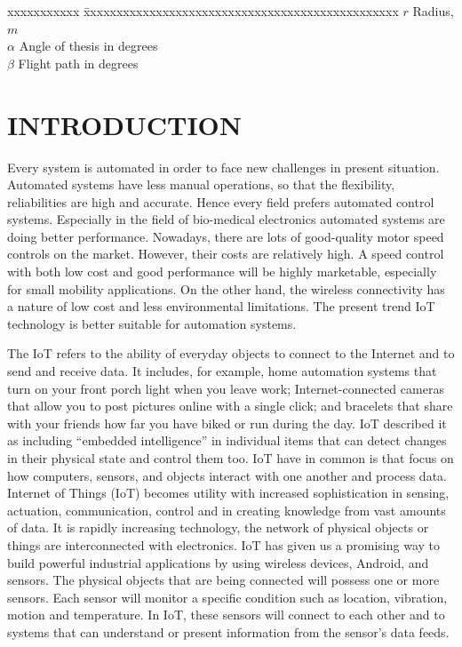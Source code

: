 \documentclass[MTech]{iitmdiss}
\begin{document}
\begin{singlespace}
\begin{tabbing}
xxxxxxxxxxx \= xxxxxxxxxxxxxxxxxxxxxxxxxxxxxxxxxxxxxxxxxxxxxxxx \kill
\textbf{$r$}  \> Radius, $m$ \\
\textbf{$\alpha$}  \> Angle of thesis in degrees \\
\textbf{$\beta$}   \> Flight path in degrees \\
\end{tabbing}
\end{singlespace}

\pagebreak
\clearpage




\chapter{INTRODUCTION}
\label{chap:intro}

Every system is automated in order to face new challenges in present situation. Automated systems have less manual operations, so that the flexibility, reliabilities are high and accurate. Hence every field prefers automated control systems. Especially in the field of bio-medical electronics automated systems are doing better performance. Nowadays, there are lots of good-quality motor speed controls on the market. However, their costs are relatively high. A speed control with both low cost and good performance will be highly marketable, especially for small mobility applications. On the other hand, the wireless connectivity has a nature of low cost and less environmental limitations. The present trend IoT technology is better suitable for automation systems. 

The IoT refers to the ability of everyday objects to connect to the Internet and to send and receive data. It includes, for example, home automation systems that turn on your front porch light when you leave work; Internet-connected cameras that allow you to post pictures online with a single click; and bracelets that share with your friends how far you have biked or run during the day. IoT described it as including “embedded intelligence” in individual items that can detect changes in their physical state and control them too. IoT have in common is that focus on how computers, sensors, and objects interact with one another and process data. Internet of Things (IoT) becomes utility with increased sophistication in sensing, actuation, communication, control and in creating knowledge from vast amounts of data. It is rapidly increasing technology, the network of physical objects or things are interconnected with electronics. IoT has given us a promising way to build powerful industrial applications by using wireless devices, Android, and sensors. The physical objects that are being connected will possess one or more sensors. Each sensor will monitor a specific condition such as location, vibration, motion and temperature. In IoT, these sensors will connect to each other and to systems that can understand or present information from the sensor’s data feeds. 
\end{document}
